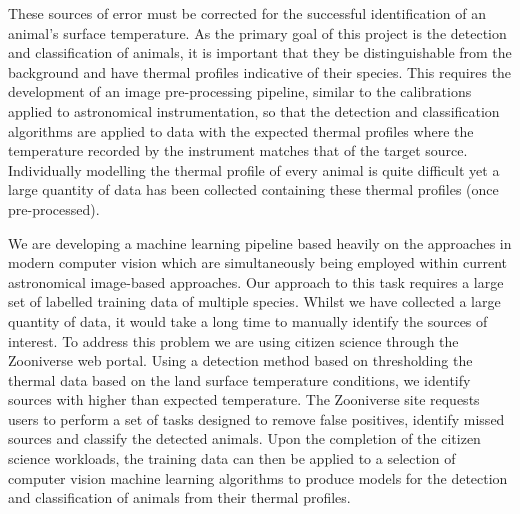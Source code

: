 \documentclass{report}
\begin{document}
These sources of error must be corrected for the successful identification of an animal’s surface temperature. As the primary goal of this project is the detection and classification of animals, it is important that they be distinguishable from the background and have thermal profiles indicative of their species. This requires the development of an image pre-processing pipeline, similar to the calibrations applied to astronomical instrumentation, so that the detection and classification algorithms are applied to data with the expected thermal profiles where the temperature recorded by the instrument matches that of the target source. Individually modelling the thermal profile of every animal is quite difficult yet a large quantity of data has been collected containing these thermal profiles (once pre-processed).

We are developing a machine learning pipeline based heavily on the approaches in modern computer vision which are simultaneously being employed within current astronomical image-based approaches. Our approach to this task requires a large set of labelled training data of multiple species. Whilst we have collected a large quantity of data, it would take a long time to manually identify the sources of interest. To address this problem we are using citizen science through the Zooniverse web portal. Using a detection method based on thresholding the thermal data based on the land surface temperature conditions, we identify sources with higher than expected temperature. The Zooniverse site requests users to perform a set of tasks designed to remove false positives, identify missed sources and classify the detected animals. Upon the completion of the citizen science workloads, the training data can then be applied to a selection of computer vision machine learning algorithms to produce models for the detection and classification of animals from their thermal profiles.\newline
\newpage
\end{document}
